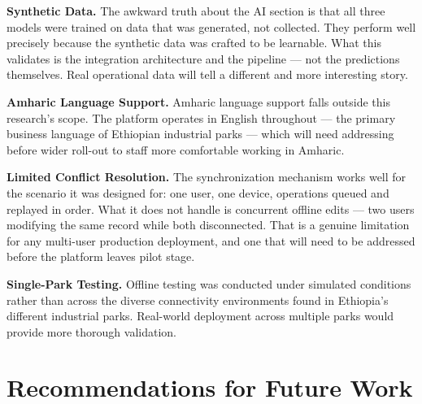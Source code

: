 \textbf{Synthetic Data.} The awkward truth about the AI section is that all three models were trained on data that was generated, not collected. They perform well precisely because the synthetic data was crafted to be learnable. What this validates is the integration architecture and the pipeline --- not the predictions themselves. Real operational data will tell a different and more interesting story.

\textbf{Amharic Language Support.} Amharic language support falls outside this research's scope. The platform operates in English throughout --- the primary business language of Ethiopian industrial parks --- which will need addressing before wider roll-out to staff more comfortable working in Amharic.

\textbf{Limited Conflict Resolution.} The synchronization mechanism works well for the scenario it was designed for: one user, one device, operations queued and replayed in order. What it does not handle is concurrent offline edits --- two users modifying the same record while both disconnected. That is a genuine limitation for any multi-user production deployment, and one that will need to be addressed before the platform leaves pilot stage.

\textbf{Single-Park Testing.} Offline testing was conducted under simulated conditions rather than across the diverse connectivity environments found in Ethiopia's different industrial parks. Real-world deployment across multiple parks would provide more thorough validation.

\section{Recommendations for Future Work}

